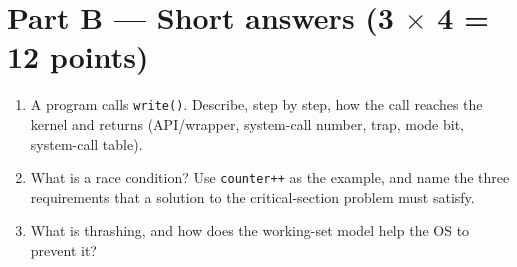 \section*{Part B --- Short answers \hfill (3 $\times$ 4 = 12 points)}
\begin{enumerate}[leftmargin=1.8em,label=B\arabic*.]
  \item A program calls \texttt{write()}. Describe, step by step, how the call reaches the kernel and returns (API/wrapper, system-call number, trap, mode bit, system-call table). 
  \ans{3.2cm}
  \item What is a race condition? Use \texttt{counter++} as the example, and name the three requirements that a solution to the critical-section problem must satisfy. 
  \ans{3.2cm}
  \item What is thrashing, and how does the working-set model help the OS to prevent it? 
  \ans{3.2cm}
\end{enumerate}

\newpage
